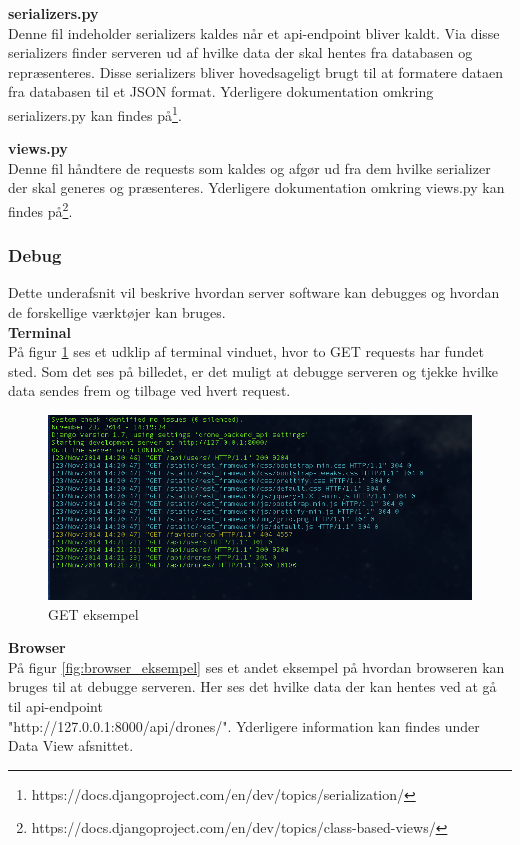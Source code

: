 \textbf{serializers.py} \\
Denne fil indeholder serializers kaldes når et api-endpoint bliver kaldt. Via disse serializers finder serveren ud af hvilke data der skal hentes fra databasen og repræsenteres. Disse serializers bliver hovedsageligt brugt til at formatere dataen fra databasen til et JSON format. Yderligere dokumentation omkring serializers.py kan findes på\footnote{https://docs.djangoproject.com/en/dev/topics/serialization/}.

\textbf{views.py} \\
Denne fil håndtere de requests som kaldes og afgør ud fra dem hvilke serializer der skal generes og præsenteres. Yderligere dokumentation omkring views.py kan findes på\footnote{https://docs.djangoproject.com/en/dev/topics/class-based-views/}.
\newpage

\subsubsection*{Debug}
Dette underafsnit vil beskrive hvordan server software kan debugges og hvordan de forskellige værktøjer kan bruges.\\

\textbf{Terminal}\\
På figur \ref{fig:get_eksempel} ses et udklip af terminal vinduet, hvor to GET requests har fundet sted. Som det ses på billedet, er det muligt at debugge serveren og tjekke hvilke data sendes frem og tilbage ved hvert request. 

\begin{figure}[H]
	\centering
	\includegraphics[width=1\textwidth]{Billeder/implementation/get_eksempel.png}
	\caption{GET eksempel}
	\label{fig:get_eksempel}
\end{figure}

\textbf{Browser}\\
På figur \ref{fig:browser_eksempel} ses et andet eksempel på hvordan browseren kan bruges til at debugge serveren. Her ses det hvilke data der kan hentes ved at gå til api-endpoint\\
"http://127.0.0.1:8000/api/drones/". Yderligere information kan findes under Data View afsnittet.


